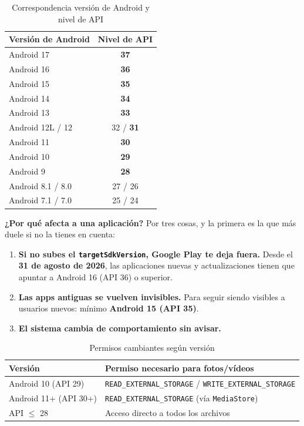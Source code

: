 \documentclass[11pt,a4paper]{article}
\newcommand{\code}[1]{\texttt{\color{ink}#1}}
\newcommand{\campo}[1]{\textbf{\color{ink}#1}}
\begin{document}
	\begin{table}[htbp]
		\centering
		\small
		\begin{tabular}{@{}l c@{}}
			\toprule
			\rowcolor{primary}
			\textcolor{paper}{\sffamily\bfseries Versión de Android} & \textcolor{paper}{\sffamily\bfseries Nivel de API} \\
			\midrule
			Android 17 & \textbf{37} \\
			\rowcolor{soft}
			Android 16 & \textbf{36} \\
			Android 15 & \textbf{35} \\
			\rowcolor{soft}
			Android 14 & \textbf{34} \\
			Android 13 & \textbf{33} \\
			\rowcolor{soft}
			Android 12L / 12 & 32 / \textbf{31} \\
			Android 11 & \textbf{30} \\
			\rowcolor{soft}
			Android 10 & \textbf{29} \\
			Android 9 & \textbf{28} \\
			\rowcolor{soft}
			Android 8.1 / 8.0 & 27 / 26 \\
			Android 7.1 / 7.0 & 25 / 24 \\
			\bottomrule
		\end{tabular}
		\caption{Correspondencia versión de Android y nivel de API}
	\end{table}
	
	\campo{¿Por qué afecta a una aplicación?}
	Por tres cosas, y la primera es la que más duele si no la tienes en cuenta:
	\begin{enumerate}[leftmargin=*,itemsep=0.15em]
		\item \textbf{Si no subes el \code{targetSdkVersion}, Google Play te deja fuera.} Desde el \textbf{31 de agosto de 2026}, las aplicaciones nuevas y actualizaciones tienen que apuntar a Android 16 (API 36) o superior.
		\item \textbf{Las apps antiguas se vuelven invisibles.} Para seguir siendo visibles a usuarios nuevos: mínimo \textbf{Android 15 (API 35)}.
		\item \textbf{El sistema cambia de comportamiento sin avisar.}
	\end{enumerate}
	
	\begin{table}[htbp]
		\centering
		\small
		\begin{tabular}{@{}l l@{}}
			\toprule
			\rowcolor{primary}
			\textcolor{paper}{\sffamily\bfseries Versión} & \textcolor{paper}{\sffamily\bfseries Permiso necesario para fotos/vídeos} \\
			\midrule
			Android 10 (API 29) & \code{READ\_EXTERNAL\_STORAGE} / \code{WRITE\_EXTERNAL\_STORAGE} \\
			\rowcolor{soft}
			Android 11+ (API 30+) & \code{READ\_EXTERNAL\_STORAGE} (vía \code{MediaStore}) \\
			API $\leq$ 28 & Acceso directo a todos los archivos \\
			\bottomrule
		\end{tabular}
		\caption{Permisos cambiantes según versión}
	\end{table}
	
\end{document}

